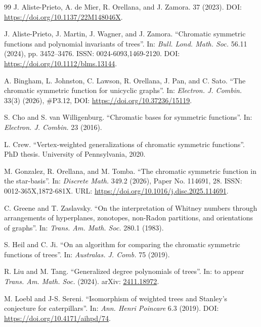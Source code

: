 \documentclass[12pt]{amsart}  %
\theoremstyle{definition}
\theoremstyle{remark}
\numberwithin{equation}{section}
\begin{document}
\begin{thebibliography}{99}
 J. Aliste-Prieto, A. de Mier, R. Orellana, and J. Zamora. 
 37 (2023). DOI: \url{https://doi.org/10.1137/22M148046X}.

J. Aliste-Prieto, J. Martin, J. Wagner, and J. Zamora. \newblock ``Chromatic symmetric functions and polynomial invariants of trees''. \newblock In: \emph{Bull. Lond. Math. Soc.} 56.11 (2024), pp. 3452--3476. \newblock ISSN: 0024-6093,1469-2120.
\newblock DOI: \url{https://doi.org/10.1112/blms.13144}.

A. Bingham, L. Johnston, C. Lawson, R. Orellana, J. Pan, and C. Sato. ``The chromatic symmetric function for unicyclic graphs''. In: \textit{Electron. J. Combin.} 33(3) (2026), \#P3.12, \newblock DOI: \url{https://doi.org/10.37236/15119}.

S. Cho and S. van Willigenburg. ``Chromatic bases for symmetric functions''. In: \textit{Electron. J. Combin.} 23 (2016).

L. Crew. ``Vertex-weighted generalizations of chromatic symmetric functions''. PhD thesis. University of Pennsylvania, 2020.

M. Gonzalez, R. Orellana, and M. Tomba. ``The chromatic symmetric function in the star-basis''. In: \textit{Discrete Math.} 349.2 (2026), Paper No. 114691, 28. ISSN: 0012-365X,1872-681X. URL: \url{https://doi.org/10.1016/j.disc.2025.114691}.

 C. Greene and T. Zaslavsky. ``On the interpretation of Whitney numbers through arrangements of hyperplanes, zonotopes, non-Radon partitions, and orientations of graphs''. In: \textit{Trans. Am. Math. Soc.} 280.1 (1983).

 S. Heil and C. Ji. ``On an algorithm for comparing the chromatic symmetric functions of trees''. In: \textit{Australas. J. Comb.} 75 (2019).

 R. Liu and M. Tang. ``Generalized degree polynomials of trees''. In: to appear \textit{Trans. Am. Math. Soc.} (2024). arXiv: \href{https://arxiv.org}{2411.18972}.

 M. Loebl and J-S. Sereni. ``Isomorphism of weighted trees and Stanley's conjecture for caterpillars''. In: \textit{Ann. Henri Poincare} 6.3 (2019). DOI: \href{https://doi.org/10.4171/aihpd/74}{https://doi.org/10.4171/aihpd/74}.


\end{thebibliography}
\end{document}
